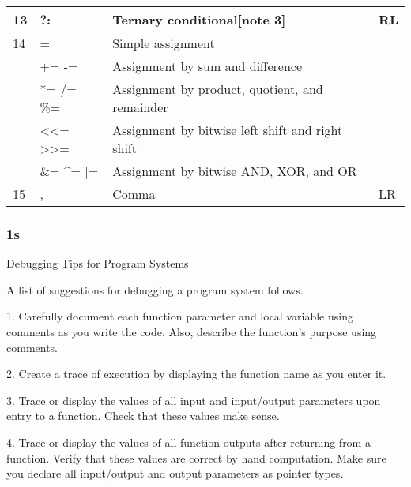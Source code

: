 \documentclass{extarticle}
\begin{document}
\begin{tabular}{|l|l|l|l|}
13             & ?:                                                    & Ternary conditional{[}note 3{]}                                        & RL            \\ \hline
14 & =                                                     & Simple assignment                                                      &               \\
               & += -=                                                 & Assignment by sum and difference                                       &               \\
               & *= /= \%=                                             & Assignment by product, quotient, and remainder                         &               \\
               & \textless{}\textless{}= \textgreater{}\textgreater{}= & Assignment by bitwise left shift and right shift                       &               \\
               & \&= \textasciicircum{}= |=                            & Assignment by bitwise AND, XOR, and OR                                 &               \\ \hline
15             & ,                                                     & Comma                                                                  & LR            \\ \hline
\end{tabular}


\subsubsection{1s}

Debugging Tips for Program Systems

A list of suggestions for debugging a program system follows.

1. Carefully document each function parameter and local variable using comments as you write the code. Also, describe the function’s purpose using comments.

2. Create a trace of execution by displaying the function name as you enter it.

3. Trace or display the values of all input and input/output parameters upon entry to a function. Check that these values make sense.

4. Trace or display the values of all function outputs after returning from a function. Verify that these values are correct by hand computation. Make sure you declare all input/output and output parameters as pointer types.
\end{document}

